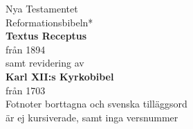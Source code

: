 \begin{center}

    {\fontsize{45}{50}\selectfont Nya Testamentet}\\[1em]

    {\fontsize{20}{24}\selectfont 
    {Reformationsbibeln*} }\\[1em]

    {\fontsize{20}{24}\selectfont \textbf{Textus Receptus}}\\[0.5em]
    {\fontsize{12}{15}\selectfont från 1894}\\[0.5em]

    {\fontsize{12}{15}\selectfont samt revidering av}\\[1em]

    {\fontsize{20}{24}\selectfont \textbf{Karl XII:s Kyrkobibel}}\\[0.5em]
    {\fontsize{12}{15}\selectfont från 1703}\\[4em]

    {\fontsize{11}{13} \selectfont *Fotnoter borttagna och svenska tilläggsord\\ är ej kursiverade, samt inga versnummer}

\end{center}